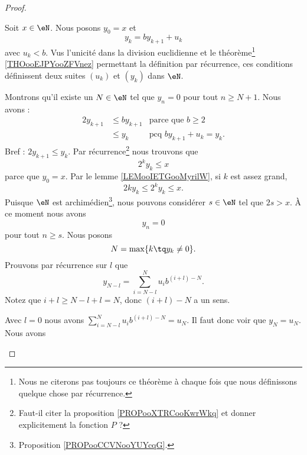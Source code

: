 \begin{proof}
\begin{subproof}
		\spitem[Existence]
		Soit \( x\in \eN\). Nous posons \( y_0=x\) et
		\begin{equation}
			y_k=by_{k+1}+u_k
		\end{equation}
		avec \( u_k<b\). Vus l'unicité dans la division euclidienne et le théorème\footnote{Nous ne citerons pas toujours ce théorème à chaque fois que nous définissons quelque chose par récurrence.} \ref{THOooEJPYooZFVnez} permettant la définition par récurrence, ces conditions définissent deux suites \( (u_k)\) et \( (y_k)\) dans \( \eN\).

		Montrons qu'il existe un \( N\in \eN\) tel que \( y_n=0\) pour tout \( n\geq N+1\). Nous avons :
		\begin{subequations}
			\begin{align}
				2y_{k+1} & \leq b y_{k+1} & \text{parce que } b\geq 2    \\
				         & \leq y_k       & \text{pcq }by_{k+1}+u_k=y_k.
			\end{align}
		\end{subequations}
		Bref : \( 2y_{k+1}\leq y_k\). Par récurrence\footnote{Faut-il citer la proposition \ref{PROPooXTRCooKwrWkq} et donner explicitement la fonction \( P\) ?} nous trouvons que
		\begin{equation}
			2^ky_k\leq x
		\end{equation}
		parce que \( y_0=x\). Par le lemme \ref{LEMooIETGooMyrilW}, si \( k\) est assez grand,
		\begin{equation}
			2ky_k\leq 2^ky_k\leq x.
		\end{equation}
		Puisque \( \eN\) est archimédien\footnote{Proposition \ref{PROPooCCVNooYUYcqG}.}, nous pouvons considérer \( s\in \eN\) tel que \( 2s>x\). À ce moment nous avons
		\begin{equation}
			y_n=0
		\end{equation}
		pour tout \( n\geq s\). Nous posons
		\begin{equation}
			N=\max\{ k\tq y_k\neq 0 \}.
		\end{equation}
		Prouvons par récurrence sur \( l\) que
		\begin{equation}        \label{EQooZBKQooFqcckr}
			y_{N-l}=\sum_{i=N-l}^Nu_ib^{(i+l)-N}.
		\end{equation}
		Notez que \( i+l\geq N-l+l=N\), donc \( (i+l)-N\) a un sens.
		\begin{subproof}
			\spitem[Pour \( l=0\)]
			Avec \( l=0\) nous avons \( \sum_{i=N-l}^Nu_ib^{(i+l)-N}=u_N\). Il faut donc voir que \( y_N=u_N\). Nous avons
			\begin{equation}

\end{equation}
\end{subproof}
\end{subproof}
\end{proof}
